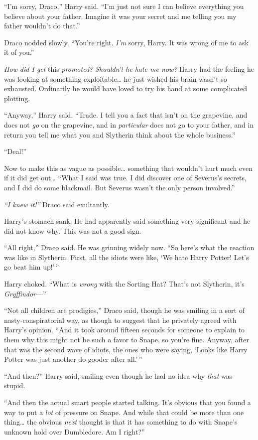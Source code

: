 ``I'm sorry, Draco,'' Harry said. ``I'm just not sure I can believe
everything you believe about your father. Imagine it was your secret and
me telling you my father wouldn't do that.''

Draco nodded slowly. ``You're right. \emph{I'm} sorry, Harry. It was
wrong of me to ask it of you.''

\emph{How did I get} this \emph{promoted? Shouldn't he hate me now?}
Harry had the feeling he was looking at something exploitable\ldots{} he
just wished his brain wasn't so exhausted. Ordinarily he would have
loved to try his hand at some complicated plotting.

``Anyway,'' Harry said. ``Trade. I tell you a fact that isn't on the
grapevine, and does not \emph{go} on the grapevine, and in
\emph{particular} does not go to your father, and in return you tell me
what you and Slytherin think about the whole business.''

``Deal!''

Now to make this as vague as possible\ldots{} something that wouldn't
hurt much even if it did get out\ldots{} ``What I said was true. I did
discover one of Severus's secrets, and I did do some blackmail. But
Severus wasn't the only person involved.''

\emph{``I knew it!''} Draco said exultantly.

Harry's stomach sank. He had apparently said something very significant
and he did not know why. This was not a good sign.

``All right,'' Draco said. He was grinning widely now. ``So here's what
the reaction was like in Slytherin. First, all the idiots were like, `We
hate Harry Potter! Let's go beat him up!'\,''

Harry choked. ``What is \emph{wrong} with the Sorting Hat? That's not
Slytherin, it's \emph{Gryffindor}---''

``Not all children are prodigies,'' Draco said, though he was smiling in
a sort of nasty-conspiratorial way, as though to suggest that he
privately agreed with Harry's opinion. ``And it took around fifteen
seconds for someone to explain to them why this might not be such a
favor to Snape, so you're fine. Anyway, after that was the second wave
of idiots, the ones who were saying, `Looks like Harry Potter was just
another do-gooder after all.'\,''

``And then?'' Harry said, smiling even though he had no idea why
\emph{that} was stupid.

``And then the actual smart people started talking. It's obvious that
you found a way to put a \emph{lot} of pressure on Snape. And while that
could be more than one thing\ldots{} the obvious \emph{next} thought is
that it has something to do with Snape's unknown hold over Dumbledore.
Am I right?''

